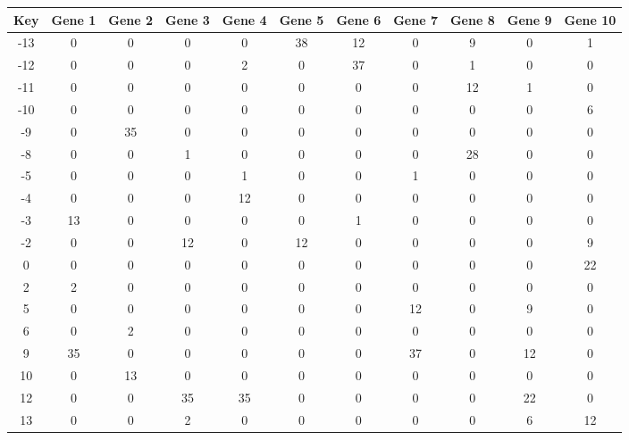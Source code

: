 \begin{tabular}{|c|c|c|c|c|c|c|c|c|c|c|}
\hline
Key & Gene 1 & Gene 2 & Gene 3 & Gene 4 & Gene 5 & Gene 6 & Gene 7 & Gene 8 & Gene 9 & Gene 10 \\
\hline
-13 & 0 & 0 & 0 & 0 & 38 & 12 & 0 & 9 & 0 & 1 \\
-12 & 0 & 0 & 0 & 2 & 0 & 37 & 0 & 1 & 0 & 0 \\
-11 & 0 & 0 & 0 & 0 & 0 & 0 & 0 & 12 & 1 & 0 \\
-10 & 0 & 0 & 0 & 0 & 0 & 0 & 0 & 0 & 0 & 6 \\
-9 & 0 & 35 & 0 & 0 & 0 & 0 & 0 & 0 & 0 & 0 \\
-8 & 0 & 0 & 1 & 0 & 0 & 0 & 0 & 28 & 0 & 0 \\
-5 & 0 & 0 & 0 & 1 & 0 & 0 & 1 & 0 & 0 & 0 \\
-4 & 0 & 0 & 0 & 12 & 0 & 0 & 0 & 0 & 0 & 0 \\
-3 & 13 & 0 & 0 & 0 & 0 & 1 & 0 & 0 & 0 & 0 \\
-2 & 0 & 0 & 12 & 0 & 12 & 0 & 0 & 0 & 0 & 9 \\
0 & 0 & 0 & 0 & 0 & 0 & 0 & 0 & 0 & 0 & 22 \\
2 & 2 & 0 & 0 & 0 & 0 & 0 & 0 & 0 & 0 & 0 \\
5 & 0 & 0 & 0 & 0 & 0 & 0 & 12 & 0 & 9 & 0 \\
6 & 0 & 2 & 0 & 0 & 0 & 0 & 0 & 0 & 0 & 0 \\
9 & 35 & 0 & 0 & 0 & 0 & 0 & 37 & 0 & 12 & 0 \\
10 & 0 & 13 & 0 & 0 & 0 & 0 & 0 & 0 & 0 & 0 \\
12 & 0 & 0 & 35 & 35 & 0 & 0 & 0 & 0 & 22 & 0 \\
13 & 0 & 0 & 2 & 0 & 0 & 0 & 0 & 0 & 6 & 12 \\
\hline
\end{tabular}